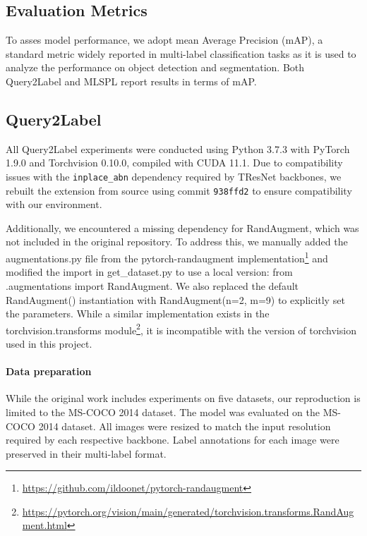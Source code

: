 \documentclass[lettersize,journal]{IEEEtran}
\begin{document}
\subsection{Evaluation Metrics}
To asses model performance, we adopt mean Average Precision (mAP), a standard metric widely reported in multi-label classification tasks as it is used to analyze the performance on object detection and segmentation. Both Query2Label and MLSPL report results in terms of mAP. 

\subsection{Query2Label}
All Query2Label experiments were conducted using Python 3.7.3 with PyTorch 1.9.0 and Torchvision 0.10.0, compiled with CUDA 11.1. Due to compatibility issues with the \texttt{inplace\_abn} dependency required by TResNet backbones, we rebuilt the extension from source using commit \texttt{938ffd2} to ensure compatibility with our environment.

Additionally, we encountered a missing dependency for RandAugment, which was not included in the original repository. To address this, we manually added the augmentations.py file from the pytorch-randaugment implementation\footnote{\url{https://github.com/ildoonet/pytorch-randaugment}} and modified the import in get\_dataset.py to use a local version: from .augmentations import RandAugment. We also replaced the default RandAugment() instantiation with RandAugment(n=2, m=9) to explicitly set the parameters. While a similar implementation exists in the torchvision.transforms module\footnote{\url{https://pytorch.org/vision/main/generated/torchvision.transforms.RandAugment.html}}, it is incompatible with the version of torchvision used in this project.

\paragraph{Data preparation}
While the original work includes experiments on five datasets, our reproduction is limited to the MS-COCO 2014 dataset. The model was evaluated on the MS-COCO 2014 dataset. All images were resized to match the input resolution required by each respective backbone. Label annotations for each image were preserved in their multi-label format.
\end{document}
